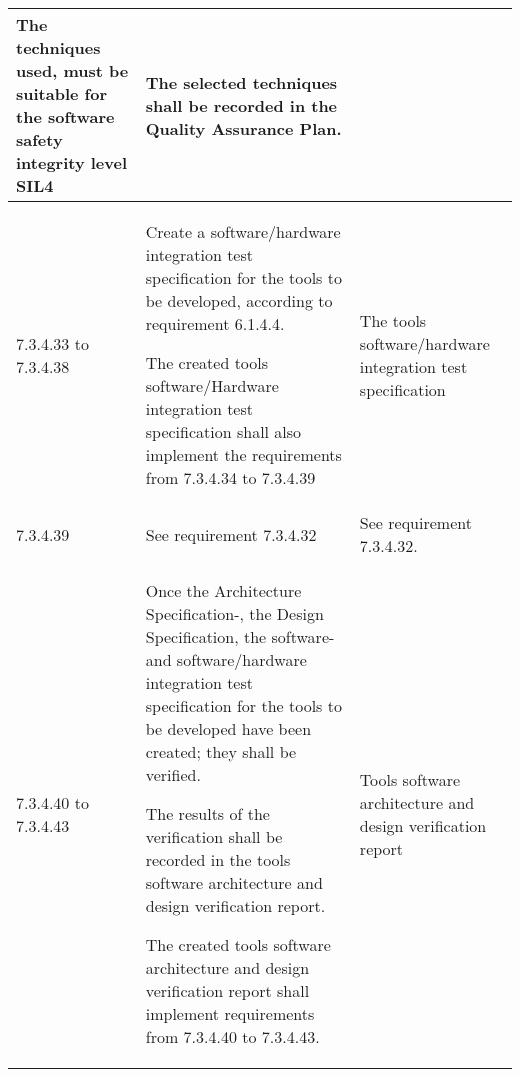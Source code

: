 \documentclass{template/openetcs_report}
\begin{document}
{\begin{longtable}{|p{2cm}|p{9cm}|p{3cm}|}
The techniques used, must be suitable for the software safety integrity level SIL4
& The selected techniques shall be recorded in the Quality Assurance Plan.\\ 
\hline
7.3.4.33 to 7.3.4.38 & Create a software/hardware integration test specification for the tools to be developed, according to requirement 6.1.4.4.

The created tools software/Hardware integration test specification shall also implement the requirements from 7.3.4.34 to 7.3.4.39
& The tools software/hardware integration test specification \\ 
\hline
7.3.4.39 & See requirement 7.3.4.32 & See requirement 7.3.4.32.\\ 
\hline
7.3.4.40 to 7.3.4.43 & Once the Architecture Specification-, the Design Specification, the software- and  software/hardware integration test specification for the tools to be developed have been created; they shall be verified.

The results of the verification shall be recorded in the tools software architecture and design verification report.

The created tools software architecture and design verification report shall implement requirements from 7.3.4.40 to 7.3.4.43.
& Tools software architecture and design verification report \\ 
\hline
\end{longtable}}
\end{document}
